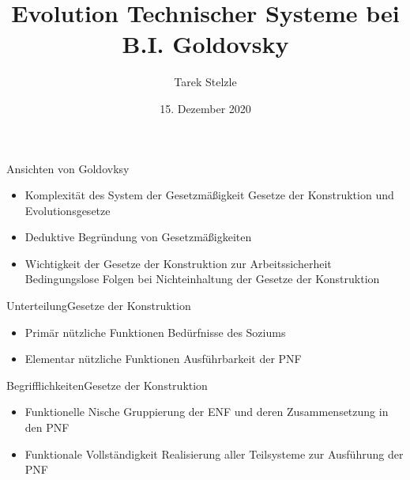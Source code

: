 \documentclass[aspectratio=169]{beamer}
\title{Evolution Technischer Systeme bei B.I. Goldovsky}
\author{Tarek Stelzle}
\date{15. Dezember 2020}
\begin{document}
    \begin{frame}
        \maketitle
    \end{frame}

    \begin{frame}{Ansichten von Goldovksy}
        \begin{itemize}
            \item Komplexität des System der Gesetzmäßigkeit \newline
            {\scriptsize Gesetze der Konstruktion und Evolutionsgesetze}
            \item Deduktive Begründung von Gesetzmäßigkeiten
            \item Wichtigkeit der Gesetze der Konstruktion zur Arbeitssicherheit \newline
            {\scriptsize Bedingungslose Folgen bei Nichteinhaltung der Gesetze der Konstruktion}
        \end{itemize}
    \end{frame}

    \begin{frame}{Unterteilung}{Gesetze der Konstruktion}
        \begin{itemize}
            \item Primär nützliche Funktionen \newline
            {\scriptsize Bedürfnisse des Soziums}
            \item Elementar nützliche Funktionen \newline
            {\scriptsize Ausführbarkeit der PNF}
        \end{itemize}
    \end{frame}

    \begin{frame}{Begrifflichkeiten}{Gesetze der Konstruktion}
        \begin{itemize}
            \item Funktionelle Nische \newline
            {\scriptsize Gruppierung der ENF und deren Zusammensetzung in den PNF}
            \item Funktionale Vollständigkeit \newline
            {\scriptsize Realisierung aller Teilsysteme zur Ausführung der PNF}
        \end{itemize}
    \end{frame}
\end{document}
